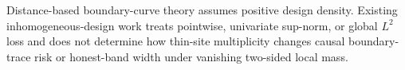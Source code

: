 Distance-based boundary-curve theory assumes positive design density. Existing inhomogeneous-design work treats pointwise, univariate sup-norm, or global \(L^2\) loss and does not determine how thin-site multiplicity changes causal boundary-trace risk or honest-band width under vanishing two-sided local mass.